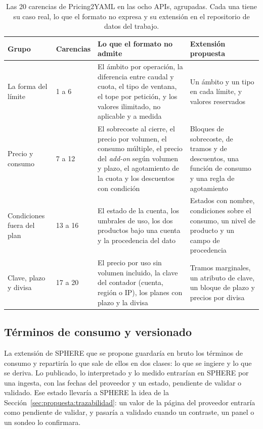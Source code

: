 \begin{table}[H]\centering\small
\begin{tabular}{|p{2.9cm}|p{1.7cm}|p{5.2cm}|p{3.9cm}|}
\hline
\raggedright\textbf{Grupo} & \raggedright\textbf{Caren\-cias} & \raggedright\textbf{Lo que el formato no admite} & \raggedright\textbf{Extensión propuesta} \tabularnewline
\hline
\raggedright La forma del límite & \raggedright 1 a 6 & \raggedright El ámbito por operación, la diferencia entre caudal y cuota, el tipo de ventana, el tope por petición, y los valores ilimitado, no aplicable y a medida & \raggedright Un ámbito y un tipo en cada límite, y valores reservados \tabularnewline
\hline
\raggedright Precio y consumo & \raggedright 7 a 12 & \raggedright El sobrecoste al cierre, el precio por volumen, el consumo múltiple, el precio del \textit{add-on} según volumen y plazo, el agotamiento de la cuota y los descuentos con condición & \raggedright Bloques de sobrecoste, de tramos y de descuentos, una función de consumo y una regla de agotamiento \tabularnewline
\hline
\raggedright Condiciones fuera del plan & \raggedright 13 a 16 & \raggedright El estado de la cuenta, los umbrales de uso, los dos productos bajo una cuenta y la procedencia del dato & \raggedright Estados con nombre, condiciones sobre el consumo, un nivel de producto y un campo de procedencia \tabularnewline
\hline
\raggedright Clave, plazo y divisa & \raggedright 17 a 20 & \raggedright El precio por uso sin volumen incluido, la clave del contador (cuenta, región o IP), los planes con plazo y la divisa & \raggedright Tramos marginales, un atributo de clave, un bloque de plazo y precios por divisa \tabularnewline
\hline\end{tabular}
\caption[Las 20 carencias de Pricing2YAML en las ocho APIs, agrupadas]{Las 20 carencias de Pricing2YAML en las ocho APIs, agrupadas. Cada una tiene su caso real, lo que el formato no expresa y su extensión en el repositorio de datos del trabajo.}
\label{tab:propuesta:nomodela}\end{table}

\subsection{Términos de consumo y versionado}
\label{sec:propuesta:sphere:terminos}

La extensión de SPHERE que se propone guardaría en bruto los términos de consumo y repartiría lo que sale de ellos en dos clases: lo que se ingiere y lo que se deriva.
Lo publicado, lo interpretado y lo medido entrarían en SPHERE por una ingesta, con las fechas del proveedor y un estado, pendiente de validar o validado.
Ese estado llevaría a SPHERE la idea de la Sección~\ref{sec:propuesta:trazabilidad}: un valor de la página del proveedor entraría como pendiente de validar, y pasaría a validado cuando un contraste, un panel o un sondeo lo confirmara.

